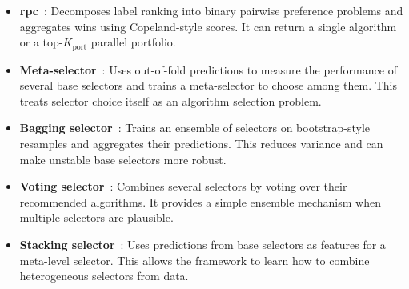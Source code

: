 \begin{itemize}
    \item \textbf{\Gls{rpc}}~\citep{HulFur04}: Decomposes label ranking into binary pairwise preference problems and aggregates wins using Copeland-style scores. It can return a single algorithm or a top-$K_{\mathrm{port}}$ parallel portfolio.
    \item \textbf{Meta-selector}~\citep{TorEtAl23}: Uses out-of-fold predictions to measure the performance of several base selectors and trains a meta-selector to choose among them. This treats selector choice itself as an algorithm selection problem.
    \item \textbf{Bagging selector}~\citep{TorEtAl23}: Trains an ensemble of selectors on bootstrap-style resamples and aggregates their predictions. This reduces variance and can make unstable base selectors more robust.
    \item \textbf{Voting selector}~\citep{TorEtAl23}: Combines several selectors by voting over their recommended algorithms. It provides a simple ensemble mechanism when multiple selectors are plausible.
    \item \textbf{Stacking selector}~\citep{TorEtAl23}: Uses predictions from base selectors as features for a meta-level selector. This allows the framework to learn how to combine heterogeneous selectors from data.
\end{itemize}


